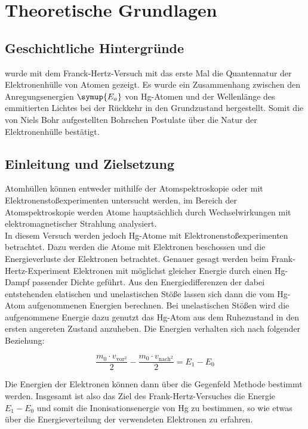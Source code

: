 \section{Theoretische Grundlagen}

    \subsection{Geschichtliche Hintergründe}

         wurde mit dem Franck-Hertz-Versuch mit das erste Mal die Quantennatur der Elektronenhülle von Atomen gezeigt. Es wurde ein 
        Zusammenhang zwischen den Anregungsenergien $\symup{E_a}$ von Hg-Atomen und der Wellenlänge des emmitierten Lichtes bei der Rückkehr 
        in den Grundzustand hergestellt. Somit die von Niels Bohr aufgestellten Bohrschen Postulate über die Natur der Elektronenhülle 
        bestätigt. 

    \subsection{Einleitung und Zielsetzung}

        \noindent Atomhüllen können entweder mithilfe der Atomspektroskopie oder mit Elektronenstoßexperimenten untersucht werden, im Bereich der 
        Atomspektroskopie werden Atome hauptsächlich durch Wechselwirkungen mit elektromagnetischer Strahlung analysiert.\\
        \noindent In diesem Versuch werden jedoch Hg-Atome mit Elektronenstoßexperimenten betrachtet. Dazu werden die Atome mit Elektronen 
        beschossen und die Energieverluste der Elektronen betrachtet. Genauer gesagt werden beim Frank-Hertz-Experiment Elektronen mit 
        möglichst gleicher Energie durch einen Hg-Dampf passender Dichte geführt. Aus den Energiedifferenzen der dabei entstehenden elatischen 
        und unelastischen Stöße lassen sich dann die vom Hg-Atom aufgenommenen Energien berechnen. Bei unelastischen Stößen wird die 
        aufgenommene Energie dazu genutzt das Hg-Atom aus dem Ruhezustand in den ersten angereten Zustand anzuheben. Die Energien verhalten sich 
        nach folgender Beziehung:

        \begin{equation*}
            \frac{m_0 \cdot v_{\text{vor}^2}}{2} - \frac{m_0 \cdot v_{\text{nach}^2}}{2} = E_1 - E_0
        \end{equation*}

        \noindent Die Energien der Elektronen können dann über die Gegenfeld Methode bestimmt werden.
        Insgesamt ist also das Ziel des Frank-Hertz-Versuches die Energie $E_1 - E_0$ und somit die Inonisationsenergie von Hg zu bestimmen, 
        so wie etwas über die Energieverteilung der verwendeten Elektronen zu erfahren.


